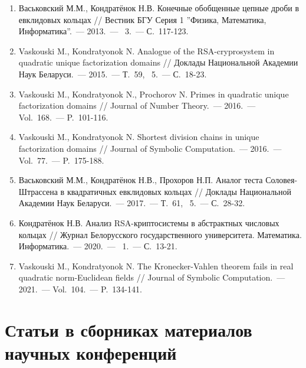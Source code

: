 \documentclass[_00_dissertation.tex]{subfiles}
\begin{document}
\begin{enumerate}

    \item \label{source:Vestnik_BSU_2013}
    Васьковский М.М., Кондратёнок Н.В. Конечные обобщенные цепные дроби в евклидовых кольцах // Вестник БГУ Серия 1 ''Физика, Математика, Информатика''.~--- 2013.~--- \textnumero~3.~--- С.~117-123.

    \item \label{source:NANB_2015}
    Vaskouski M., Kondratyonok N. Analogue of the RSA-cryprosystem in quadratic unique factorization domains // Доклады Национальной Академии Наук Беларуси.~--- 2015.~--- Т.~59, \textnumero~5.~--- С.~18-23.

    \item \label{source:JNT_2016}
    Vaskouski M., Kondratyonok N., Prochorov N. Primes in quadratic unique factorization domains // Journal of Number Theory.~--- 2016.~--- Vol.~168.~--- P.~101-116.

    \item \label{source:JSC_2016}
    Vaskouski M., Kondratyonok N. Shortest division chains in unique factorization domains // Journal of Symbolic Computation.~--- 2016.~--- Vol.~77.~--- P.~175-188.

    \item \label{source:NANB_2017}
    Васьковский М.М., Кондратёнок Н.В., Прохоров Н.П. Аналог теста Соловея-Штрассена в квадратичных евклидовых кольцах // Доклады Национальной Академии Наук Беларуси.~--- 2017.~--- Т.~61, \textnumero~5.~--- С.~28-32.

    \item \label{source:BSU_Journal_2020}
    Кондратёнок Н.В. Анализ RSA-криптосистемы в абстрактных числовых кольцах // Журнал Белорусского государственного университета. Математика. Информатика.~--- 2020.~--- \textnumero~1.~--- С.~13-21.

    \item \label{source:JSC_2021}
    Vaskouski M., Kondratyonok N. The Kronecker-Vahlen theorem fails in real quadratic norm-Euclidean fields // Journal of Symbolic Computation.~--- 2021.~--- Vol.~104.~--- P.~134-141.
\end{enumerate}

\vspace{-4ex}
\section*{\fontsize{14}{15}\selectfont Статьи в сборниках материалов научных конференций}
\vspace{-4ex}
\end{document}

